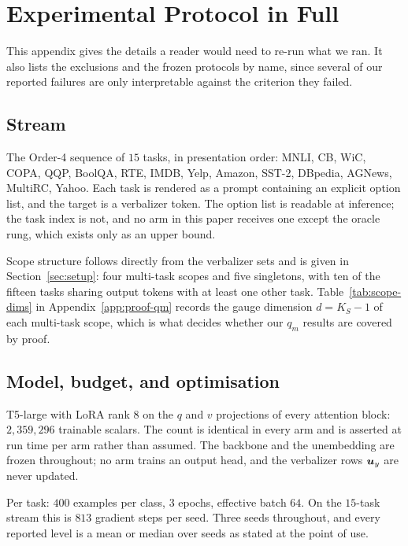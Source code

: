 \section{Experimental Protocol in Full}
\label{app:experiments}

This appendix gives the details a reader would need to re-run what we ran. It also
lists the exclusions and the frozen protocols by name, since several of our
reported failures are only interpretable against the criterion they failed.

\subsection{Stream}
\label{app:stream}

The Order-4 sequence of $15$ tasks, in presentation order: MNLI, CB, WiC, COPA,
QQP, BoolQA, RTE, IMDB, Yelp, Amazon, SST-2, DBpedia, AGNews, MultiRC, Yahoo. Each
task is rendered as a prompt containing an explicit option list, and the target is
a verbalizer token. The option list is readable at inference; the task index is
not, and no arm in this paper receives one except the oracle rung, which exists
only as an upper bound.

Scope structure follows directly from the verbalizer sets and is given in
Section~\ref{sec:setup}: four multi-task scopes and five singletons, with ten of
the fifteen tasks sharing output tokens with at least one other task.
Table~\ref{tab:scope-dims} in Appendix~\ref{app:proof-qm} records the gauge
dimension $d=K_S-1$ of each multi-task scope, which is what decides whether our
$q_m$ results are covered by proof.

\subsection{Model, budget, and optimisation}
\label{app:model}

T5-large with LoRA rank $8$ on the $q$ and $v$ projections of every attention
block: $2{,}359{,}296$ trainable scalars. The count is identical in every arm and
is asserted at run time per arm rather than assumed. The backbone and the
unembedding are frozen throughout; no arm trains an output head, and the
verbalizer rows $\bm{u}_y$ are never updated.

Per task: $400$ examples per class, $3$ epochs, effective batch $64$. On the
$15$-task stream this is $813$ gradient steps per seed. Three seeds throughout,
and every reported level is a mean or median over seeds as stated at the point of
use.

